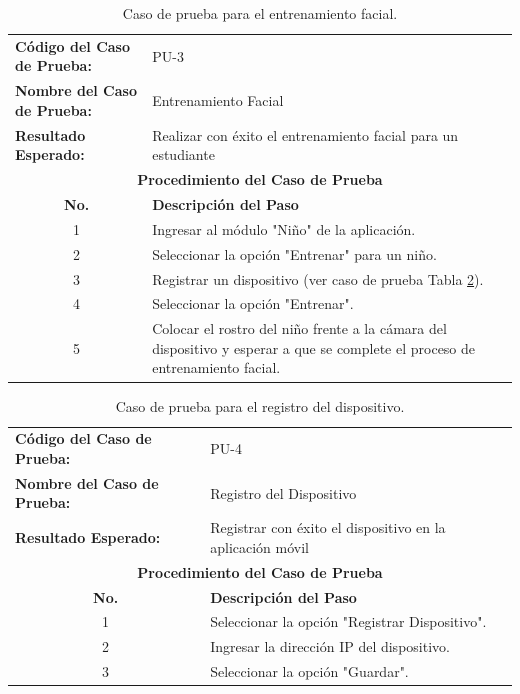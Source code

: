 \documentclass[a4paper,fleqn]{cas-sc}
\begin{document}
				\begin{table}[hbt!]
					\centering
					\caption{Caso de prueba para el entrenamiento facial.}
					\label{tab:face-training-test-case}
					\begin{tabularx}{\textwidth}{l X}
						\toprule
						\textbf{Código del Caso de Prueba:} & PU-3 \\
						\textbf{Nombre del Caso de Prueba:} & Entrenamiento Facial \\
						\textbf{Resultado Esperado:} & Realizar con éxito el entrenamiento facial para un estudiante\\
						\midrule
						\multicolumn{2}{c}{\textbf{Procedimiento del Caso de Prueba}} \\
						\midrule
						\multicolumn{1}{c}{\textbf{No.}} & \textbf{Descripción del Paso} \\
						\midrule
						\multicolumn{1}{c}{1} & Ingresar al módulo "Niño" de la aplicación. \\
						\multicolumn{1}{c}{2} & Seleccionar la opción "Entrenar" para un niño. \\
						\multicolumn{1}{c}{3} & Registrar un dispositivo (ver caso de prueba Tabla \ref{tab:device-registration-test-case}). \\
						\multicolumn{1}{c}{4} & Seleccionar la opción "Entrenar". \\
						\multicolumn{1}{c}{5} & Colocar el rostro del niño frente a la cámara del dispositivo y esperar a que se complete el proceso de entrenamiento facial. \\
						\bottomrule
					\end{tabularx}
				\end{table}
				
				\begin{table}[hbt!]
					\centering
					\caption{Caso de prueba para el registro del dispositivo.}
					\label{tab:device-registration-test-case}
					\begin{tabularx}{\textwidth}{l X}
						\toprule
						\textbf{Código del Caso de Prueba:} & PU-4 \\
						\textbf{Nombre del Caso de Prueba:} & Registro del Dispositivo \\
						\textbf{Resultado Esperado:} & Registrar con éxito el dispositivo en la aplicación móvil \\
						\midrule
						\multicolumn{2}{c}{\textbf{Procedimiento del Caso de Prueba}} \\
						\midrule
						\multicolumn{1}{c}{\textbf{No.}} & \textbf{Descripción del Paso} \\
						\midrule
						\multicolumn{1}{c}{1} & Seleccionar la opción "Registrar Dispositivo". \\
						\multicolumn{1}{c}{2} & Ingresar la dirección IP del dispositivo. \\
						\multicolumn{1}{c}{3} & Seleccionar la opción "Guardar". \\
						\bottomrule
					\end{tabularx}
				\end{table}
				
\end{document}

